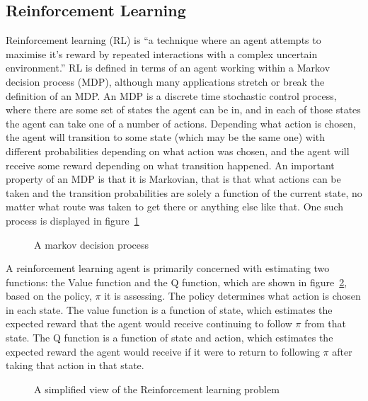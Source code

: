 \subsection{Reinforcement Learning}
Reinforcement learning (RL) is ``a technique where an agent attempts to maximise it's reward by repeated interactions with a complex uncertain environment.'' \cite{Sutton:1998:IRL:551283}
RL is defined in terms of an agent working within a Markov decision process (MDP), although many applications stretch or break the definition of an MDP. An MDP is a discrete time stochastic control process, where there are some set of states the agent can be in, and in each of those states the agent can take one of a number of actions. Depending what action is chosen, the agent will transition to some state (which may be the same one) with different probabilities depending on what action was chosen, and the agent will receive some reward depending on what transition happened. An important property of an MDP is that it is Markovian, that is that what actions can be taken and the transition probabilities are solely a function of the current state, no matter what route was taken to get there or anything else like that. One such process is displayed in figure~\ref{fig:mdpsimple}

\begin{figure}
\centering

\caption{A markov decision process}
\label{fig:mdpsimple}
\end{figure}

A reinforcement learning agent is primarily concerned with estimating two functions: the Value function and the Q function, which are shown in figure~\ref{fig:rlsimple}, based on the policy, $\pi$ it is assessing. The policy determines what action is chosen in each state. The value function is a function of state, which estimates the expected reward that the agent would receive continuing to follow $\pi$ from that state. The Q function is a function of state and action, which estimates  the expected reward the agent would receive if it were to return to following $\pi$ after taking that action in that state.

\begin{figure}
\centering

\caption{A simplified view of the Reinforcement learning problem}
\label{fig:rlsimple}
\end{figure}

